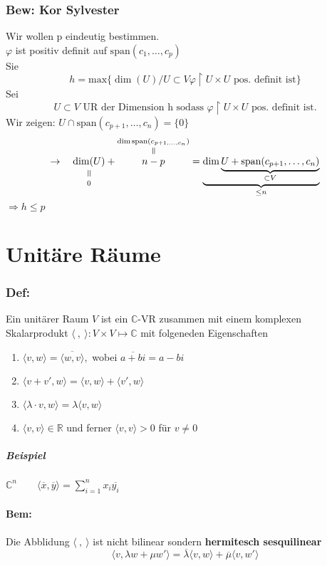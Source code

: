 \documentclass[titlepage,12pt,a4paper,ngerman]{report}
\newcommand{\verteq}{\rotatebox{90}{$\,=$}}
\newcommand{\equalto}[2]{\underset{\scriptstyle\overset{\mkern4mu\verteq}{#2}}{#1}}
\newcommand{\equaltoup}[2]{\overset{\scriptstyle\underset{\mkern4mu\verteq}{#2}}{#1}}
\newcommand{\tx}[1]{\textrm{#1}}
\newcommand{\ub}[1]{\underbrace{#1}}
\newcommand{\spa}{\tx{span}}
\newcommand{\summ}[2]{\sum_{#1}^{#2}}
\begin{document}
\subsection{Bew: Kor Sylvester}
Wir wollen p eindeutig bestimmen.\\
$ \varphi $ ist positiv definit auf $ \spa(c_1,\dots,c_p) $\\
Sie $$ h = \tx{max} \{\dim (U) / U \subset V \varphi\upharpoonright U \times U \tx{ pos. definit ist}\} $$
Sei $$ U \subset V \tx{ UR der Dimension h sodass } \varphi \upharpoonright U \times U \tx{ pos. definit ist.}$$
Wir zeigen: $ U \cap \spa (c_{p+1},\dots,c_n) = \{0\} $\\
$$ \rightarrow\quad  \equalto{\dim(U)}{0} + \equaltoup{n - p}{\dim \spa(c_{p+1,\dots,c_n})} = \ub{\dim \ub{U + \spa(c_{p+1},\dots,c_n)}_{\subset V}}_{\le n} $$
$ \Rightarrow h \le p  $

\chapter{Unitäre Räume}
\subsection{Def:} Ein unitärer Raum $V$ ist ein $\mathbb C$-VR zusammen mit einem komplexen Skalarprodukt $\langle\ ,\ \rangle : V \times V \mapsto \mathbb C$ mit folgeneden Eigenschaften
\begin{enumerate}
	\item $\langle v,w \rangle = \overline{\langle w,v \rangle},$ wobei $\overline{a+bi}=a-bi$
	\item $\langle v+ v', w \rangle = \langle v,w \rangle + \langle v',w \rangle$
	\item $\langle \lambda \cdot v, w \rangle = \lambda \langle v,w \rangle$
	\item $\langle v,v \rangle \in \mathbb R$ und ferner $\langle v,v \rangle > 0$ für $v \neq 0$ 
\end{enumerate}
\paragraph{Beispiel} $\mathbb C^n \qquad \langle \overline x, \overline y \rangle = \summ{i = 1}{n} x_i \overline{y_i}$

\subsubsection{Bem:}
Die Abblidung $ \langle\ ,\ \rangle $ ist nicht bilinear sondern \textbf{hermitesch sesquilinear}
$$ \langle v,\lambda w + \mu w'\rangle = \overline{\lambda}\langle v,w \rangle + \overline{\mu} \langle v,w' \rangle$$
\end{document}

